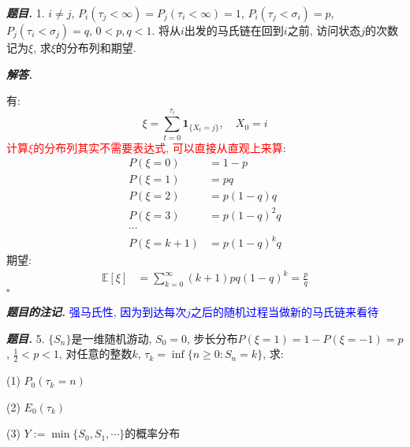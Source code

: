 \documentclass[10pt, a4paper, oneside]{ctexart}
\newenvironment{problem}{\begin{framed}\par\noindent\textbf{\textit{题目. }}}{\end{framed}\par}
\newenvironment{solution}{%
  \par\noindent\textbf{\textit{解答. }}\ignorespaces
}{%
  \hfill\ensuremath{\square}\par %
}
\newenvironment{note}{\par\noindent\textbf{\textit{题目的注记. }}\ignorespaces}{\par}
\begin{document}
\begin{problem}
    1. $i\neq j$, $P_i(\tau_j<\infty)=P_j(\tau_i<\infty)=1$, $P_i(\tau_j<\sigma_i)=p$, $P_j(\tau_i<\sigma_j)=q$, $0<p,q<1$. 将从$i$出发的马氏链在回到$i$之前, 访问状态$j$的次数记为$\xi$, 求$\xi$的分布列和期望.
\end{problem}
\begin{solution}
有:
$$\xi = \sum_{t=0}^{\tau_i} \mathbf{1}_{\{X_t=j\}}, \quad X_0=i$$
\textcolor{red}{计算$\xi$的分布列其实不需要表达式, 可以直接从直观上来算}:
\begin{align*}
    P(\xi=0)&=1-p\\
    P(\xi=1)&=pq\\
    P(\xi=2)&=p(1-q)q\\
    P(\xi=3)&=p(1-q)^2q\\
    \cdots&\\
    P(\xi=k+1)&=p(1-q)^kq
\end{align*}
期望:
\begin{align*}
    \mathbb{E}[\xi]&=\sum_{k=0}^{\infty} (k+1)pq(1-q)^k=\frac{p}{q}
\end{align*}
\end{solution}
\begin{note}
\textcolor{blue}{强马氏性, 因为到达每次$j$之后的随机过程当做新的马氏链来看待}
\end{note}
\begin{problem}
    5. $\{S_n\}$是一维随机游动, $S_0=0$, 步长分布$P(\xi=1)=1-P(\xi=-1)=p$, $\frac{1}{2}<p<1$, 对任意的整数$k$, $\tau_k=\inf\{n\geq 0 : S_n=k\}$, 求:

(1) $P_0(\tau_k=n)$

(2) $E_0(\tau_k)$

(3) $Y:=\min\{S_0,S_1,\cdots\}$的概率分布
\end{problem}
\end{document}
